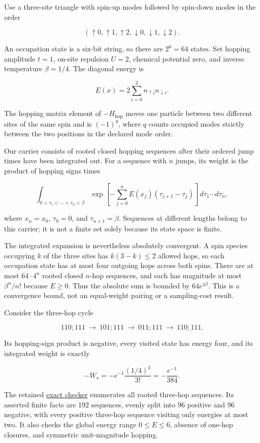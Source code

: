 \documentclass[
  11pt,
]{article}
\begin{document}
Use a three-site triangle with spin-up modes followed by spin-down modes
in the order

\[
(\uparrow0,\uparrow1,\uparrow2,\downarrow0,\downarrow1,\downarrow2).
\]

An occupation state is a six-bit string, so there are \(2^6=64\) states.
Set hopping amplitude \(t=1\), on-site repulsion \(U=2\), chemical
potential zero, and inverse temperature \(\beta=1/4\). The diagonal
energy is

\[
E(x)=2\sum_{i=0}^{2}n_{\uparrow i}n_{\downarrow i}.
\]

The hopping matrix element of \(-H_{\mathrm{hop}}\) moves one particle
between two different sites of the same spin and is \((-1)^q\), where
\(q\) counts occupied modes strictly between the two positions in the
declared mode order.

Our carrier consists of rooted closed hopping sequences after their
ordered jump times have been integrated out. For a sequence with \(n\)
jumps, its weight is the product of hopping signs times

\[
\int_{0<\tau_1<\cdots<\tau_n<\beta}
\exp\!\left[-\sum_{j=0}^{n} E(x_j)(\tau_{j+1}-\tau_j)\right]
\,d\tau_1\cdots d\tau_n,
\]

where \(x_n=x_0\), \(\tau_0=0\), and \(\tau_{n+1}=\beta\). Sequences at
different lengths belong to this carrier; it is not a finite set solely
because its state space is finite.

The integrated expansion is nevertheless absolutely convergent. A spin
species occupying \(k\) of the three sites has \(k(3-k)\leq2\) allowed
hops, so each occupation state has at most four outgoing hops across
both spins. There are at most \(64\cdot4^n\) rooted closed \(n\)-hop
sequences, and each has magnitude at most \(\beta^n/n!\) because
\(E\geq0\). Thus the absolute sum is bounded by \(64e^{4\beta}\). This
is a convergence bound, not an equal-weight pairing or a sampling-cost
result.

Consider the three-hop cycle

\[
110;111\ \longrightarrow\ 101;111\
\longrightarrow\ 011;111\ \longrightarrow\ 110;111.
\]

Its hopping-sign product is negative, every visited state has energy
four, and its integrated weight is exactly

\[
-W_\star=-e^{-1}\frac{(1/4)^3}{3!}
=-\frac{e^{-1}}{384}.
\]

The retained
\href{https://github.com/dbccpage/the_symbol_game/blob/main/education/documentation/030_pfp_proposal_fidelity_protocol_pfp/papers/symbol_game/002_pfp_signed_presentations_and_search_frontier/code/exact_fock_gap.py}{exact
checker} enumerates all rooted three-hop sequences. Its asserted finite
facts are 192 sequences, evenly split into 96 positive and 96 negative,
with every positive three-hop sequence visiting only energies at most
two. It also checks the global energy range \(0\leq E\leq6\), absence of
one-hop closures, and symmetric unit-magnitude hopping.
\end{document}
